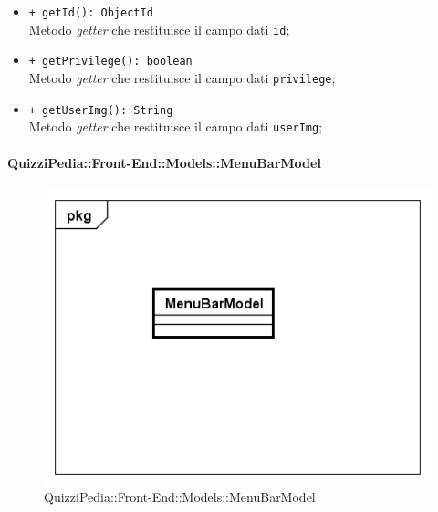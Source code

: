 \begin{itemize}
\begin{itemize}
				\item \texttt{+ getId(): ObjectId} \\
				Metodo \textit{getter} che restituisce il campo dati \texttt{id};
				
				\item \texttt{+ getPrivilege(): boolean} \\
				Metodo \textit{getter} che restituisce il campo dati \texttt{privilege};
				
				\item \texttt{+ getUserImg(): String} \\
				Metodo \textit{getter} che restituisce il campo dati \texttt{userImg};
				
			\end{itemize}
		\end{itemize}	
		
		\paragraph{QuizziPedia::Front-End::Models::MenuBarModel}
		
		\label{QuizziPedia::Front-End::Models::MenuBarModel}
		
		\begin{figure}[ht]
			\centering
			\includegraphics[scale=0.5,keepaspectratio]{UML/Classi/Front-End/QuizziPedia_Front-end_Models_MenuBarModel.png}
			\caption{QuizziPedia::Front-End::Models::MenuBarModel}
		\end{figure} \FloatBarrier
		
